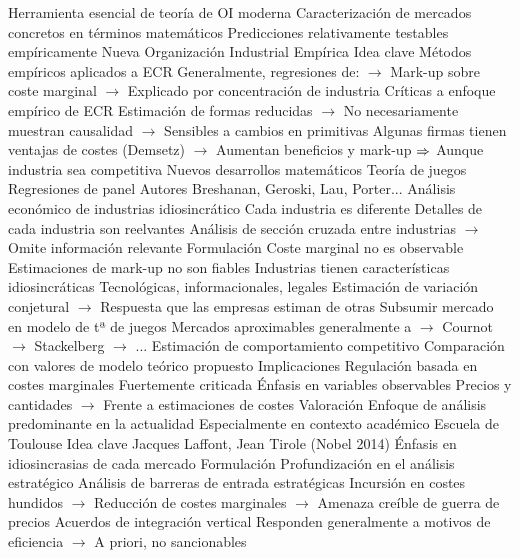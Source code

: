\documentclass{nuevotema}
\begin{document}
\begin{esquemal}
				\4 Herramienta esencial de teoría de OI moderna
				\4 Caracterización de mercados concretos en términos matemáticos
				\4 Predicciones relativamente testables empíricamente
		\2 Nueva Organización Industrial Empírica
			\3 Idea clave
				\4 Métodos empíricos aplicados a ECR
				\4[] Generalmente, regresiones de:
				\4[] $\to$ Mark-up sobre coste marginal
				\4[] $\to$ Explicado por concentración de industria
				\4 Críticas a enfoque empírico de ECR
				\4[] Estimación de formas reducidas
				\4[] $\to$ No necesariamente muestran causalidad
				\4[] $\to$ Sensibles a cambios en primitivas
				\4[] Algunas firmas tienen ventajas de costes (Demsetz)
				\4[] $\to$ Aumentan beneficios y mark-up
				\4[] $\Rightarrow$ Aunque industria sea competitiva
				\4 Nuevos desarrollos matemáticos
				\4[] Teoría de juegos
				\4[] Regresiones de panel
				\4 Autores
				\4[] Breshanan, Geroski, Lau, Porter...
				\4 Análisis económico de industrias idiosincrático
				\4[] Cada industria es diferente
				\4[] Detalles de cada industria son reelvantes
				\4[] Análisis de sección cruzada entre industrias
				\4[] $\to$ Omite información relevante
			\3 Formulación
				\4 Coste marginal no es observable
				\4[] Estimaciones de mark-up no son fiables
				\4 Industrias tienen características idiosincráticas
				\4[] Tecnológicas, informacionales, legales
				\4 Estimación de variación conjetural
				\4[] $\to$ Respuesta que las empresas estiman de otras
				\4 Subsumir mercado en modelo de tª de juegos
				\4[] Mercados aproximables generalmente a
				\4[] $\to$ Cournot
				\4[] $\to$ Stackelberg
				\4[] $\to$ ...
				\4 Estimación de comportamiento competitivo
				\4[] Comparación con valores de modelo teórico propuesto
			\3 Implicaciones
				\4 Regulación basada en costes marginales
				\4[] Fuertemente criticada
				\4 Énfasis en variables observables
				\4[] Precios y cantidades
				\4[] $\to$ Frente a estimaciones de costes
			\3 Valoración
				\4 Enfoque de análisis predominante en la actualidad
				\4[] Especialmente en contexto académico
		\2 Escuela de Toulouse
			\3 Idea clave
				\4 Jacques Laffont, Jean Tirole (Nobel 2014)
				\4 Énfasis en idiosincrasias de cada mercado
			\3 Formulación
				\4 Profundización en el análisis estratégico
				\4 Análisis de barreras de entrada estratégicas
				\4[] Incursión en costes hundidos
				\4[] $\to$ Reducción de costes marginales
				\4[] $\to$ Amenaza creíble de guerra de precios
				\4 Acuerdos de integración vertical
				\4[] Responden generalmente a motivos de eficiencia
				\4[] $\to$ A priori, no sancionables

\end{esquemal}
\end{document}
